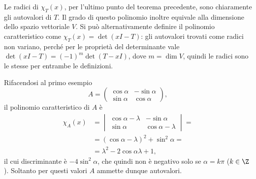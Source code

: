 Le radici di $\chi_T(x)$, per l'ultimo punto del teorema precedente, sono chiaramente gli autovalori di $T$. Il grado di questo polinomio inoltre equivale alla dimensione dello spazio vettoriale $V$.
Si può alternativamente definire il polinomio caratteristico come $\chi_T(x)=\det(xI-T)$: gli autovalori trovati come radici non variano, perché per le proprietà del determinante vale $\det(xI-T)=(-1)^m\det(T-xI)$, dove $m=\dim V$, quindi le radici sono le stesse per entrambe le definizioni.

Rifacendosi al primo esempio
\begin{equation*}
A=\begin{pmatrix}\cos\alpha&-\sin\alpha\\\sin\alpha&\cos\alpha\end{pmatrix},
\end{equation*}
il polinomio caratteristico di $A$ è
\begin{equation*}
	\begin{split}
		\chi_A(x)&=\begin{vmatrix}\cos\alpha-\lambda&-\sin\alpha\\\sin\alpha&\cos\alpha-\lambda\end{vmatrix}=\\
		&=(\cos\alpha-\lambda)^2+\sin^2\alpha=\\
		&=\lambda^2-2\cos\alpha\lambda+1,
	\end{split}
\end{equation*}
il cui discriminante è $-4\sin^2\alpha$, che quindi non è negativo solo se $\alpha=k\pi$ ($k\in\Z$).
Soltanto per questi valori $A$ ammette dunque autovalori.

